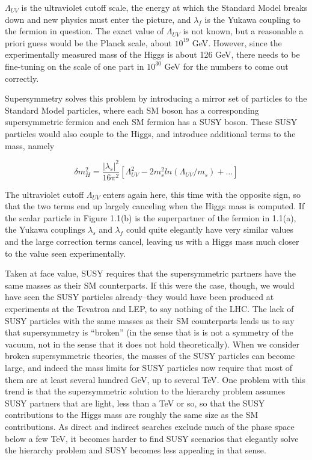 $\Lambda_{UV}$ is the ultraviolet cutoff scale, the energy at which 
the Standard Model breaks down and new physics must enter the picture, and 
$\lambda_f$ is the Yukawa coupling to the fermion in question.  The 
exact value of $\Lambda_{UV}$ is not known, but a reasonable 
a priori guess would be the Planck scale, about $10^{19}$ 
GeV.  However, since the experimentally measured mass of the Higgs is about 126 
GeV, there needs to be fine-tuning on the scale of one part in  
$10^{30}$ GeV for the numbers to come out correctly.

Supersymmetry solves this problem by introducing a mirror set of particles to the Standard Model 
particles, where each SM boson has a corresponding supersymmetric fermion and each SM fermion 
has a SUSY boson.  These SUSY particles would also couple to the Higgs, 
and introduce additional terms to the mass, namely

\begin{equation}
	\delta m_H^2 = \frac{|\lambda_s |^2}{16\pi^2}[\Lambda_{UV}^2-2m_s^2ln(\Lambda_{UV}/m_s)+\ldots]
\end{equation}

The ultraviolet cutoff $\Lambda_{UV}$ enters again here, this time with 
the opposite sign, so that the two terms end up largely canceling when the Higgs mass is computed. 
If the scalar particle in Figure 1.1(b) is the superpartner of the fermion in 1.1(a),
the Yukawa couplings $\lambda_s$ and $\lambda_f$ could quite elegantly have very 
similar values and the large correction terms cancel, leaving us with a Higgs mass
much closer to the value seen experimentally. 

Taken at face value, SUSY requires that the supersymmetric partners have the same masses 
as their SM counterparts.  If this were the case, though, we would 
have seen the SUSY particles already--they would have been produced at experiments
at the Tevatron and LEP, to say nothing of the LHC.
The lack of SUSY particles with the same masses as their SM counterparts 
leads us to say that supersymmetry is ``broken'' (in the sense 
that is is not a symmetry of the vacuum, not in the sense that 
it does not hold theoretically).  When we consider broken supersymmetric theories, the 
masses of the SUSY particles can become large, and indeed the mass limits for 
SUSY particles now require that most of them are at least several hundred GeV, up 
to several TeV.  One problem with this trend is that the supersymmetric solution to 
the hierarchy problem assumes SUSY partners that are light, less than a TeV or 
so, so that the SUSY contributions to the Higgs mass are roughly the same 
size as the SM contributions.  As direct and indirect searches exclude much of the 
phase space below a few TeV, it becomes harder to find SUSY scenarios that 
elegantly solve the hierarchy problem and SUSY becomes less appealing in that sense. 

